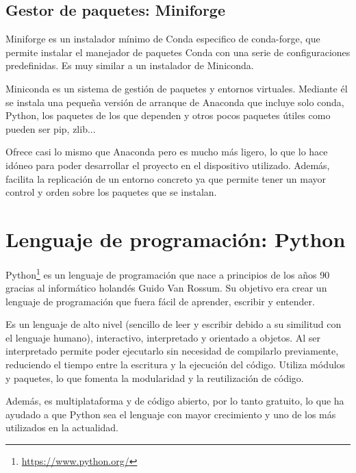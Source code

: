 \documentclass[a4paper, 12pt]{book}
\begin{document}
\subsection{Gestor de paquetes: Miniforge}
\label{subsec:gestor_de_paquetes}


Miniforge\cite{Miniforge} es un instalador mínimo de Conda especifico de conda-forge, que permite instalar el manejador de paquetes Conda con una serie de configuraciones predefinidas. Es muy similar a un instalador de Miniconda.

Miniconda es un sistema de gestión de paquetes y entornos virtuales. Mediante él se instala una pequeña versión de arranque de Anaconda que incluye solo conda, Python, los paquetes de los que dependen y otros pocos paquetes útiles como pueden ser pip, zlib...

Ofrece casi lo mismo que Anaconda pero es mucho más ligero, lo que lo hace idóneo para poder desarrollar el proyecto en el dispositivo utilizado. Además, facilita la replicación de un entorno concreto ya que permite tener un mayor control y orden sobre los paquetes que se instalan. 

\section{Lenguaje de programación: Python}
\label{sec:lenguaje_de_programación}

Python\footnote{\url{https://www.python.org/}} es un lenguaje de programación que nace a principios de los años 90 gracias al informático holandés Guido Van Rossum. Su objetivo era crear un lenguaje de programación que fuera fácil de aprender, escribir y entender.

Es un lenguaje de alto nivel (sencillo de leer y escribir debido a su similitud con el lenguaje humano), interactivo, interpretado y orientado a objetos. Al ser interpretado permite poder ejecutarlo sin necesidad de compilarlo previamente, reduciendo el tiempo entre la escritura y la ejecución del código. Utiliza módulos y paquetes, lo que fomenta la modularidad y la reutilización de código. 

Además, es multiplataforma y de código abierto, por lo tanto gratuito, lo que ha ayudado a que Python sea el lenguaje con mayor crecimiento y uno de los más utilizados en la actualidad.  
\end{document}
